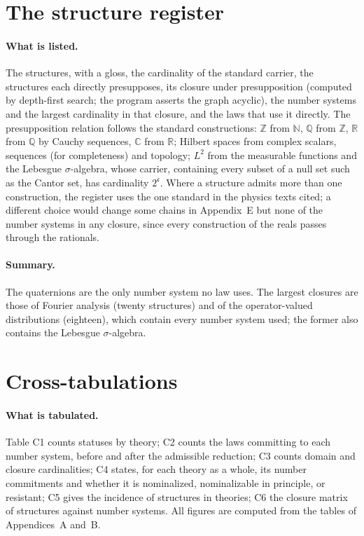 \documentclass{situationist-preprint}
\begin{document}


\section{The structure register}\label{app:b}

\paragraph{What is listed.} The \nStructures{} structures, with a gloss, the cardinality of the standard carrier, the structures each directly presupposes, its closure under presupposition (computed by depth-first search; the program asserts the graph acyclic), the number systems and the largest cardinality in that closure, and the laws that use it directly. The presupposition relation follows the standard constructions: $\mathbb Z$ from $\mathbb N$, $\mathbb Q$ from $\mathbb Z$, $\mathbb R$ from $\mathbb Q$ by Cauchy sequences, $\mathbb C$ from $\mathbb R$; Hilbert spaces from complex scalars, sequences (for completeness) and topology; $L^2$ from the measurable functions and the Lebesgue $\sigma$-algebra, whose carrier, containing every subset of a null set such as the Cantor set, has cardinality $2^{\mathfrak c}$. Where a structure admits more than one construction, the register uses the one standard in the physics texts cited; a different choice would change some chains in Appendix~E but none of the number systems in any closure, since every construction of the reals passes through the rationals.

\paragraph{Summary.} The quaternions are the only number system no law uses. The largest closures are those of Fourier analysis (twenty structures) and of the operator-valued distributions (eighteen), which contain every number system used; the former also contains the Lebesgue $\sigma$-algebra.



\section{Cross-tabulations}\label{app:c}

\paragraph{What is tabulated.} Table C1 counts statuses by theory; C2 counts the laws committing to each number system, before and after the admissible reduction; C3 counts domain and closure cardinalities; C4 states, for each theory as a whole, its number commitments and whether it is nominalized, nominalizable in principle, or resistant; C5 gives the incidence of structures in theories; C6 the closure matrix of structures against number systems. All figures are computed from the tables of Appendices~A and~B.
\end{document}
